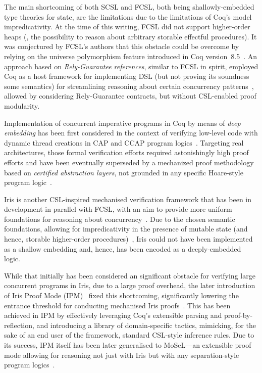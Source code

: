 The main shortcoming of both SCSL and FCSL, both being
shallowly-embedded type theories for state, are the limitations due to
the limitations of Coq's model \wrt impredicativity.
%
At the time of this writing, FCSL did not support higher-order heaps
(\ie, the possibility to reason about arbitrary storable effectful
procedures). It was conjectured by FCSL's authors that this obstacle
could be overcome by relying on the universe polymorphism feature
introduced in Coq version~8.5~\citep{Sozeau-Tabareau:ITP14}.
%
An approach based on \emph{Rely-Guarantee references}, similar to FCSL
in spirit, employed Coq as a host framework for implementing DSL (but
not proving its soundness \wrt some semantics) for streamlining
reasoning about certain concurrency
patterns~\citep{Gordon-al:TOPLAS17}, allowed by considering
Rely-Guarantee contracts, but without CSL-enabled proof modularity.

Implementation of concurrent imperative programs in Coq by means of
\emph{deep embedding} has been first considered in the context of
verifying low-level code with dynamic thread creations in CAP and CCAP
program logics~\citep{Yu-Shao:ICFP04,Feng-Shao:ICFP05}.
%
Targeting real architectures, those formal verification efforts
required astonishingly high proof efforts and have been eventually
superseded by a mechanized proof methodology based on \emph{certified
  abstraction layers}, not grounded in any specific Hoare-style
program logic~\citep{Gu-al:POPL15,Kim-al:APLAS17,Gu-al:PLDI18}.

Iris is another CSL-inspired mechanised verification framework that
has been in development in parallel with FCSL, with an aim to provide
more uniform foundations for reasoning about concurrency~\citep{Jung-al:POPL15}.
%
Due to the chosen semantic foundations, allowing for impredicativity
in the presence of mutable state (and hence, storable higher-order
procedures)~\citep{Svendsen-Birkedal:ESOP14}, Iris could not have been
implemented as a shallow embedding and, hence, has been encoded as a
deeply-embedded logic.

While that initially has been considered an significant obstacle for
verifying large concurrent programs in Iris, due to a large proof
overhead, the later introduction of Iris Proof Mode
(IPM)~\citep{Krebbers-al:POPL17} fixed this shortcoming, significantly
lowering the entrance threshold for conducting mechanised Iris
proofs~\citep{iris-tutorial}.
%
This has been achieved in IPM by effectively leveraging Coq's
extensible parsing and proof-by-reflection, and introducing a library
of domain-specific tactics, mimicking, for the sake of an end user of
the framework, standard CSL-style inference rules.
%
Due to its success, IPM itself has been later generalised to
MoSeL---an extensible proof mode allowing for reasoning not just with
Iris but with any separation-style program logics~\citep{Krebbers2018}.

